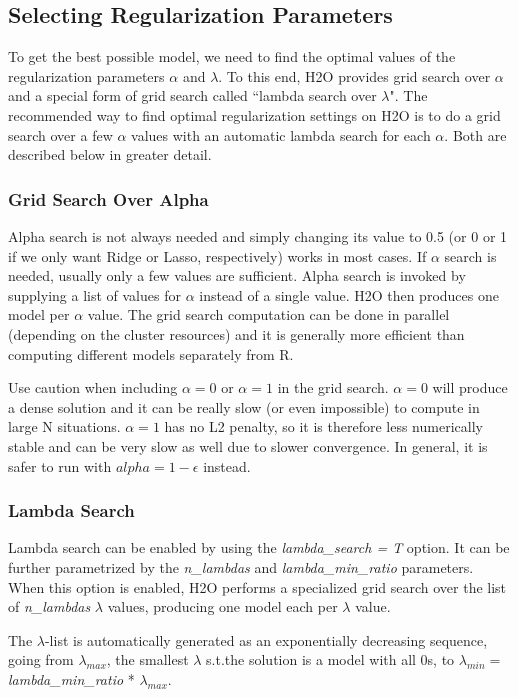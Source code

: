 \documentclass[11pt]{article}
\begin{document}
\subsection{Selecting Regularization Parameters}
To get the best possible model, we need to find the optimal values of the regularization parameters $\alpha$ and $\lambda$. 
To this end, H2O provides grid search over $\alpha$ and a special form of grid search called ``lambda search over $\lambda$". The recommended way to find optimal regularization settings on H2O is to do a grid search over a few $\alpha$ values with an automatic lambda search for each $\alpha$. Both are described below in greater detail. 
\subsubsection{Grid Search Over Alpha}
Alpha search is not always needed and simply changing its value to 0.5 (or 0 or 1 if we only want Ridge or Lasso, respectively) works in most cases. If $\alpha$ search is needed, usually only a few values are sufficient. Alpha search is invoked by supplying a list of values for $\alpha$ instead of a single value. H2O then produces one model per $\alpha$ value. The grid search computation can be done in parallel (depending on the cluster resources) and it is generally more efficient than computing different models separately from R. 

Use caution when including $\alpha=0$ or $\alpha=1$ in the grid search. $\alpha=0$ will produce a dense solution and it can be really slow (or even impossible) to compute in large N situations. $\alpha=1$ has no L2 penalty, so it is therefore less numerically stable and can be very slow as well due to slower convergence. In general, it is safer to run with $alpha=1-\epsilon$ instead.

\subsubsection{Lambda Search}
Lambda search can be enabled by using the \textit{lambda\_search = T} option. It can be further parametrized by the \textit{n\_lambdas} and \textit{lambda\_min\_ratio} parameters. When this option is enabled, H2O performs a specialized grid search over the list of \textit{n\_lambdas} $\lambda$ values, producing one model each per  $\lambda$ value. 

The $\lambda$-list is automatically generated as an exponentially decreasing sequence, going from $\lambda_{max}$,
the smallest $\lambda$ s.t.the solution is a model with all 0s, to $\lambda_{min} = $ \textit{lambda\_min\_ratio} * $ \lambda_{max}$.
\end{document}
